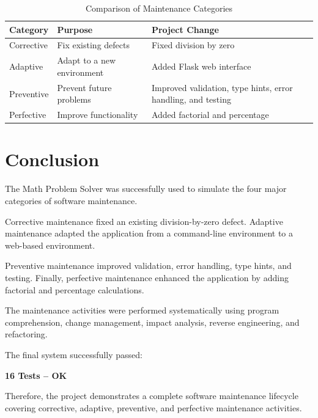 \documentclass[12pt,a4paper,openany]{report}
\begin{document}
\begin{table}[H]
\centering
\renewcommand{\arraystretch}{1.5}
\begin{tabular}{p{3.2cm} p{4cm} p{5.2cm}}
\toprule
\textbf{Category} &
\textbf{Purpose} &
\textbf{Project Change} \\
\midrule

Corrective &
Fix existing defects &
Fixed division by zero \\

Adaptive &
Adapt to a new environment &
Added Flask web interface \\

Preventive &
Prevent future problems &
Improved validation, type hints, error handling, and testing \\

Perfective &
Improve functionality &
Added factorial and percentage \\

\bottomrule
\end{tabular}
\caption{Comparison of Maintenance Categories}
\end{table}


\chapter{Conclusion}

The Math Problem Solver was successfully used to simulate the four major
categories of software maintenance.

Corrective maintenance fixed an existing division-by-zero defect.
Adaptive maintenance adapted the application from a command-line
environment to a web-based environment.

Preventive maintenance improved validation, error handling, type hints,
and testing. Finally, perfective maintenance enhanced the application
by adding factorial and percentage calculations.

The maintenance activities were performed systematically using program
comprehension, change management, impact analysis, reverse engineering,
and refactoring.

The final system successfully passed:

\begin{center}
\Large
\textbf{16 Tests -- OK}
\end{center}

Therefore, the project demonstrates a complete software maintenance
lifecycle covering corrective, adaptive, preventive, and perfective
maintenance activities.

\end{document}
